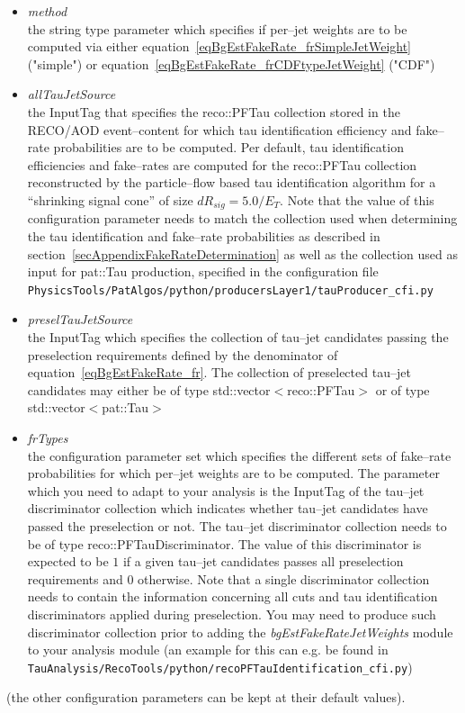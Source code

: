 \begin{itemize}
\item {\it method} \\
  the string type parameter which specifies if per--jet weights are to be computed via
  either equation~\ref{eqBgEstFakeRate_frSimpleJetWeight} ("simple") 
  or equation~\ref{eqBgEstFakeRate_frCDFtypeJetWeight} ("CDF") 
\item {\it allTauJetSource} \\
  the InputTag that specifies the reco::PFTau collection stored in the RECO/AOD event--content
  for which tau identification efficiency and fake--rate probabilities are to be computed.
  Per default, tau identification efficiencies and fake--rates are computed
  for the reco::PFTau collection reconstructed by the particle--flow based tau identification algorithm
  for a ``shrinking signal cone'' of size $dR_{sig} = 5.0 / E_{T}$.
  Note that the value of this configuration parameter needs to match the collection 
  used when determining the tau identification and fake--rate probabilities as described in section~\ref{secAppendixFakeRateDetermination}
  as well as the collection used as input for pat::Tau production,
  specified in the configuration file \newline 
  \verb|PhysicsTools/PatAlgos/python/producersLayer1/tauProducer_cfi.py|
\item {\it preselTauJetSource} \\
  the InputTag which specifies the collection of tau--jet candidates passing the preselection requirements
  defined by the denominator of equation~\ref{eqBgEstFakeRate_fr}.
  The collection of preselected tau--jet candidates may either be of type 
  std::vector$<$reco::PFTau$>$ or of type std::vector$<$pat::Tau$>$
\item {\it frTypes} \\
  the configuration parameter set which specifies the different sets of fake--rate probabilities
  for which per--jet weights are to be computed.
  The parameter which you need to adapt to your analysis is the InputTag of the tau--jet discriminator collection
  which indicates whether tau--jet candidates have passed the preselection or not.
  The tau--jet discriminator collection needs to be of type reco::PFTauDiscriminator.
  The value of this discriminator is expected to be 
  $1$ if a given tau--jet candidates passes all preselection requirements
  and $0$ otherwise.
  Note that a single discriminator collection needs to contain the information
  concerning all cuts and tau identification discriminators applied during preselection.
  You may need to produce such discriminator collection prior to adding the {\it bgEstFakeRateJetWeights} module
  to your analysis module (an example for this can e.g. be found in \newline
  \verb|TauAnalysis/RecoTools/python/recoPFTauIdentification_cfi.py|)
\end{itemize}
(the other configuration parameters can be kept at their default values).


